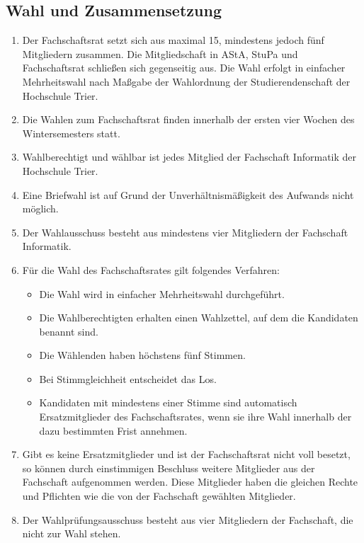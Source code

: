 \subsection{Wahl und Zusammensetzung}
\label{sec:zusammensetzung}
\begin{enumerate}
\item Der Fachschaftsrat setzt sich aus maximal 15, mindestens jedoch fünf Mitgliedern zusammen. Die Mitgliedschaft in AStA, StuPa und Fachschaftsrat schließen sich gegenseitig aus. Die Wahl erfolgt in einfacher Mehrheitswahl nach Maßgabe der Wahlordnung der Studierendenschaft der Hochschule Trier.
\item Die Wahlen zum Fachschaftsrat finden innerhalb der ersten vier Wochen des Wintersemesters statt.
\item Wahlberechtigt und wählbar ist jedes Mitglied der Fachschaft Informatik der Hochschule Trier.
\item Eine Briefwahl ist auf Grund der Unverhältnismäßigkeit des Aufwands nicht möglich.
\item Der Wahlausschuss besteht aus mindestens vier Mitgliedern der Fachschaft Informatik.
\item Für die Wahl des Fachschaftsrates gilt folgendes Verfahren:
\begin{itemize}
\item Die Wahl wird in einfacher Mehrheitswahl durchgeführt.
\item Die Wahlberechtigten erhalten einen Wahlzettel, auf dem die Kandidaten benannt sind.
\item Die Wählenden haben höchstens fünf Stimmen.
\item Bei Stimmgleichheit entscheidet das Los.
\item Kandidaten mit mindestens einer Stimme sind automatisch Ersatzmitglieder des Fachschaftsrates, wenn sie ihre Wahl innerhalb der dazu bestimmten Frist annehmen.
\end{itemize}
\item \label{ersatz} Gibt es keine Ersatzmitglieder und ist der Fachschaftsrat nicht voll besetzt, so können durch einstimmigen Beschluss weitere Mitglieder aus der Fachschaft aufgenommen werden. Diese Mitglieder haben die gleichen Rechte und Pflichten wie die von der Fachschaft gewählten Mitglieder.
\item Der Wahlprüfungsausschuss besteht aus vier Mitgliedern der Fachschaft, die nicht zur Wahl stehen.
\end{enumerate}

